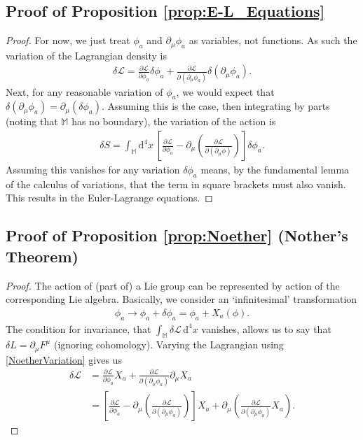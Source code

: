 \documentclass[12pt]{article}
\begin{document}
\subsection{Proof of Proposition \ref{prop:E-L_Equations}}\label{proof:E-L_Equations}
	\begin{proof}
		For now, we just treat $\phi_a$ and $\partial_\mu \phi_a$ as variables, not functions. As such the variation of the Lagrangian density is
			\begin{align}
				\delta \mathcal{L} = \frac{\partial \mathcal{L}}{\partial \phi_a} \delta \phi_a + \frac{\partial \mathcal{L}}{\partial ( \partial_\mu \phi_a )} \delta (\partial_\mu \phi_a ).
			\end{align}
		Next, for any reasonable variation of $\phi_a$, we would expect that $\delta	(\partial_\mu \phi_a) = \partial_\mu ( \delta \phi_a )$. Assuming this is the case, then integrating by parts (noting that $\mathbb{M}$ has no boundary), the variation of the action is
			\begin{align}
				\delta S = \int_\mathbb{M }\mathrm{d}^4 x \, \left[ \frac{\partial \mathcal{L}}{\partial \phi_a} - \partial_\mu \left( \frac{\partial \mathcal{L}}{\partial (\partial_\mu \phi)} \right) \right] \delta \phi_a .
			\end{align}
		Assuming this vanishes for any variation $\delta \phi_a$ means, by the fundamental lemma of the calculus of variations, that the term in square brackets must also vanish. This results in the Euler-Lagrange equations.
	\end{proof}
	
\subsection{Proof of Proposition \ref{prop:Noether} (Nother's Theorem)}\label{proof:Noether}
	\begin{proof}
		The action of (part of) a Lie group can be represented by action of the corresponding Lie algebra. Basically, we consider an `infinitesimal' transformation
			\begin{align}\label{NoetherVariation}
				\phi_a \to \phi_a + \delta \phi_a = \phi_a + X_a(\phi).
			\end{align}
		The condition for invariance, that $\int_\mathbb{M} \delta \mathcal{L} \, \mathrm{d}^4 x$ vanishes, allows us to say that $\delta L = \partial_\mu F^\mu$ (ignoring cohomology). Varying the Lagrangian using \eqref{NoetherVariation} gives us
			\begin{align}
				\delta \mathcal{L} 
				&= \frac{\partial \mathcal{L}}{\partial \phi_a} X_a + \frac{\partial \mathcal{L}}{\partial (\partial_\mu \phi_a )} \partial_\mu X_a \nonumber\\
				&= \left[ \frac{\partial \mathcal{L}}{\partial \phi_a} - \partial_\mu \left(\frac{\partial \mathcal{L}}{\partial (\partial_\mu \phi_a)} \right) \right] X_a + \partial_\mu \left( \frac{\partial \mathcal{L}}{\partial (\partial_\mu \phi_a)} X_a \right).
			\end{align}
	\end{proof}
\end{document}
